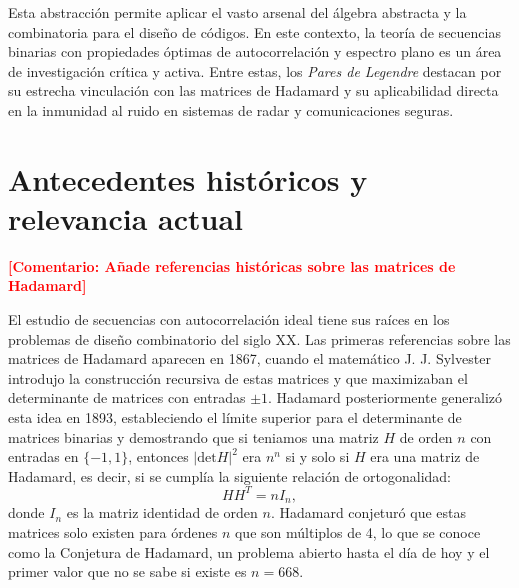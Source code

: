 \documentclass[12pt,a4paper]{tfg_domingo}
\newcommand{\Comentario}[1]{\textcolor{red}{\textbf{[Comentario:
      #1]}}}
\begin{document}
Esta abstracción permite aplicar el vasto arsenal del álgebra
abstracta y la combinatoria para el diseño de códigos.
En este contexto, la teoría de secuencias binarias con propiedades óptimas de
autocorrelación y espectro plano es un área de investigación crítica y
activa. Entre estas, los \emph{Pares de Legendre} destacan por su
estrecha vinculación con las matrices de Hadamard y su aplicabilidad
directa en la inmunidad al ruido en sistemas de radar y comunicaciones
seguras.


\section{Antecedentes históricos y relevancia actual}


\Comentario{Añade referencias históricas sobre las matrices de Hadamard}

El estudio de secuencias con autocorrelación ideal tiene sus raíces en
los problemas de diseño combinatorio del siglo XX. Las primeras
referencias sobre las matrices de Hadamard aparecen en 1867, cuando el
matemático J. J. Sylvester introdujo la construcción recursiva de
estas matrices y que maximizaban el determinante de matrices con
entradas $\pm 1$.
Hadamard posteriormente generalizó esta idea en 1893, estableciendo el
límite superior para el determinante de matrices binarias y
demostrando que si teniamos una matriz $H$ de orden $n$ con entradas
en $\{-1, 1\}$, entonces $|\mathrm{det} H |^{2}$ era $n^{n}$ si y solo si $H$ era una matriz de Hadamard, es decir, si se cumplía la siguiente relación de ortogonalidad:
\begin{equation}
  \label{eq:hadamard}
  H H^T = n I_n,
\end{equation}
donde $I_n$ es la matriz identidad de orden $n$.
Hadamard conjeturó que estas matrices solo existen para órdenes $n$
que son múltiplos de 4, lo que se conoce como la Conjetura de
Hadamard, un problema abierto hasta el día de hoy y  el primer valor que
no se sabe si existe es $n=668$.
\end{document}
